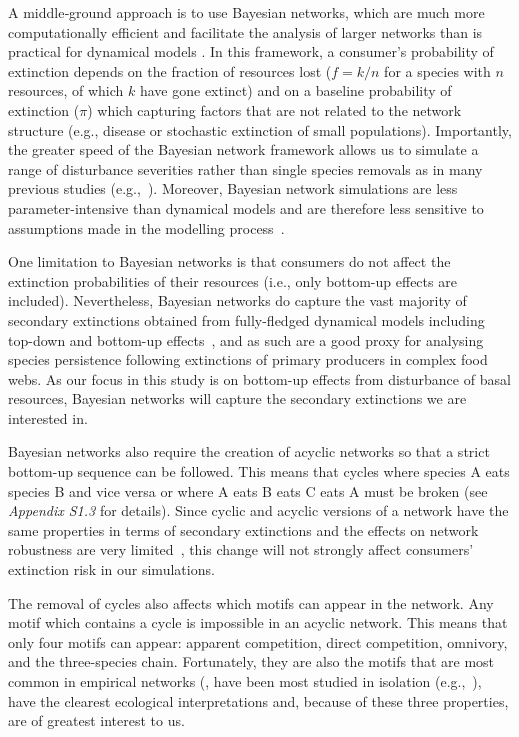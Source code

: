 \documentclass[12pt]{article}
\begin{document}
\begin{spacing}{2.0}
        
        A middle‐ground approach is to use Bayesian networks, which are much more computationally efficient and facilitate the analysis of larger networks than is practical for dynamical models \citep{Eklof2013,Haussler2020}. 
        In this framework, a consumer's probability of extinction depends on the fraction of resources lost ($f = k/n$ for a species with $n$ resources, of which $k$ have gone extinct) and on a baseline probability of extinction ($\pi$) which capturing factors that are not related to the network structure (e.g., disease or stochastic extinction of small populations).
        Importantly, the greater speed of the Bayesian network framework allows us to simulate a range of disturbance severities rather than single species removals as in many previous studies (e.g.,~\citealp[]{Memmott2004,Staniczenko2010,Dunne2004,Cirtwill2022Oikos}).
        Moreover, Bayesian network simulations are less parameter-intensive than dynamical models and are therefore less sensitive to assumptions made in the modelling process~\citep{Eklof2013}.

        One limitation to Bayesian networks is that consumers do not affect the extinction probabilities of their resources (i.e., only bottom-up effects are included).
        Nevertheless, Bayesian networks do capture the vast majority of secondary extinctions obtained from fully-fledged dynamical models including top-down and bottom-up effects~\citep{Eklof2013}, and as such are a good proxy for analysing species persistence following extinctions of primary producers in complex food webs.
        As our focus in this study is on bottom-up effects from disturbance of basal resources, Bayesian networks will capture the secondary extinctions we are interested in.

        
        Bayesian networks also require the creation of acyclic networks so that a strict bottom-up sequence can be followed. 
        This means that cycles where species A eats species B and vice versa or where A eats B eats C eats A must be broken (see \emph{Appendix S1.3} for details).
        Since cyclic and acyclic versions of a network have the same properties in terms of secondary extinctions and the effects on network robustness are very limited~\citep{Allesina2009functional}, this change will not strongly affect consumers' extinction risk in our simulations.

        
        The removal of cycles also affects which motifs can appear in the network. 
        Any motif which contains a cycle is impossible in an acyclic network.
        This means that only four motifs can appear: apparent competition, direct competition, omnivory, and the three-species chain.
        Fortunately, they are also the motifs that are most common in empirical networks (\citealp[]{Stouffer2007}, have been most studied in isolation (e.g.,~\citep{Hastings1991,Holt1987,Bascompte2005,Polis1989,Zabalo2012,Lefevre2009,Holt1997,Kondoh2008,McKinnon2013,Laws2013}), have the clearest ecological interpretations and, because of these three properties, are of greatest interest to us.



\end{spacing}
\end{document}
